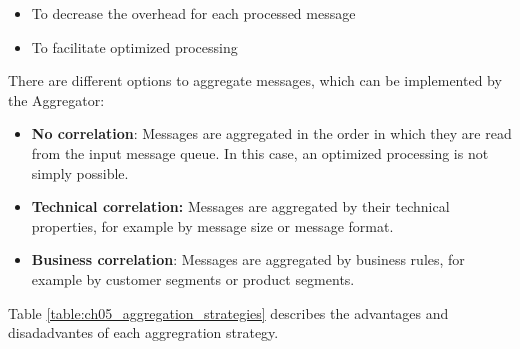 \begin{itemize}
	\item To decrease the overhead for each processed message
	\item To facilitate optimized processing
\end{itemize}

There are different options to aggregate messages, which can be implemented by the Aggregator:

\begin{itemize}
	\item \textbf{No correlation}: Messages are aggregated in the order in which they are read from the input message queue. In this case, an optimized processing is not simply possible.
	\item \textbf{Technical correlation:} Messages are aggregated by their technical properties, for example by message size or message format.
	\item \textbf{Business correlation}: Messages are aggregated by business rules, for example by customer segments or product segments.
\end{itemize}

Table \ref{table:ch05_aggregation_strategies} describes the advantages and disadadvantes of each aggregration strategy.

